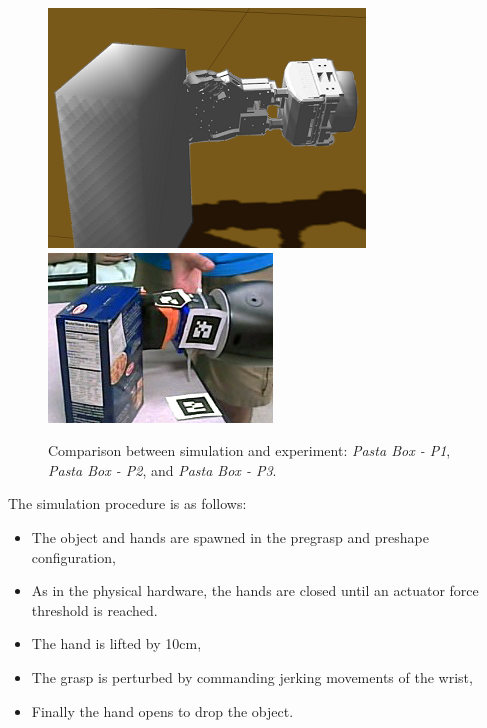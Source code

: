 \begin{figure}[!!hbt]
\begin{center}
{\includegraphics[height=0.24\columnwidth]     {images/ssoch/fig/kh_changes/softhand_p3_simu01}}%
{\includegraphics[height=0.24\columnwidth]     {images/ssoch/fig/kh_changes/softhand_p3_grasp}}
        \caption{Comparison between simulation and experiment: {\em Pasta Box - P1}, {\em Pasta Box - P2}, and {\em Pasta Box - P3}.}
        \label{pasta_box}
        \end{center}
\end{figure}


The simulation procedure is as follows:
\begin{itemize}
\item The object and hands are spawned in the pregrasp and preshape configuration,
\item As in the physical hardware, the hands are closed until an actuator force threshold is reached.
\item The hand is lifted by 10cm,
\item The grasp is perturbed by commanding jerking movements of the wrist,
\item Finally the hand opens to drop the object.
\end{itemize}

